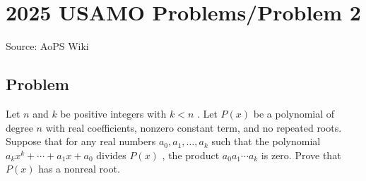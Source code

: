 \documentclass[12pt]{article}
\begin{document}
\section*{{2025 USAMO Problems/Problem 2}}
Source: AoPS Wiki

\subsection*{Problem}
Let $n$ and $k$ be positive integers with $k<n$ . Let $P(x)$ be a polynomial of degree $n$ with real coefficients, nonzero constant term, and no repeated roots. Suppose that for any real numbers $a_0, a_1, \dots, a_k$ such that the polynomial $a_kx^k+\cdots+a_1x+a_0$ divides $P(x)$ , the product $a_0a_1\cdots a_k$ is zero. Prove that $P(x)$ has a nonreal root.
\end{document}

